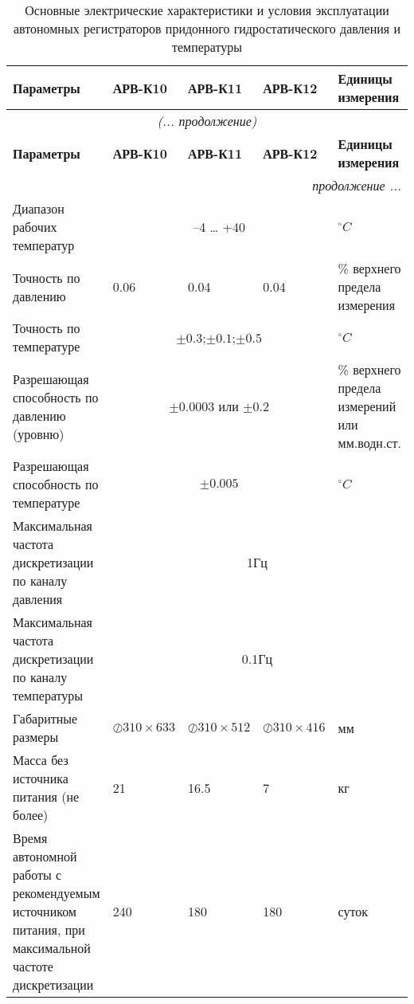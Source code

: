 \begin{longtable}{|X |X |X |X| X|}
\caption{Основные электрические характеристики и условия эксплуатации автономных регистраторов придонного гидростатического давления и температуры}\label{tbl:charact}\\
    \hline
        \textbf{Параметры} & \textbf{АРВ-К10} & \textbf{АРВ-К11} & \textbf{АРВ-К12} & \textbf{Единицы измерения} \\
    \hline
        \endfirsthead
    \hline
        \multicolumn{5}{c}{\small\slshape (... продолжение)} \\
    \hline
        \textbf{Параметры} & \textbf{АРВ-К10}&\textbf{АРВ-К11}& \textbf{АРВ-К12} & \textbf{Единицы измерения} \\
    \hline
        \endhead
    \hline
        \multicolumn{5}{|r|}{\small\slshape продолжение ...}  \\
    \hline
        \endfoot
    \hline
        \endlastfoot
    \hline
        Диапазон рабочих температур  & \multicolumn{3}{|c|}{–4 … +40}& $^{\circ}C$ \\
  \hline
        Точность по давлению & 0.06 & 0.04 & 0.04 &  \% верхнего предела измерения \\
  \hline
        Точность по температуре & \multicolumn{3}{|c|}{$\pm0.3$;$\pm0.1$;$\pm0.5$} & $^{\circ}C$ \\
  \hline
        Разрешающая способность по давлению (уровню) & \multicolumn{3}{|c|}{$\pm0.0003$ или $\pm0.2$}& \% верхнего предела измерений или мм.водн.ст. \\
  \hline
        Разрешающая способность по температуре & \multicolumn{3}{|c|}{$\pm0.005$}& $^{\circ}C$  \\
  \hline
        Максимальная частота дискретизации по каналу давления & \multicolumn{4}{|c|}{1Гц} \\
  \hline
        Максимальная частота дискретизации по каналу температуры & \multicolumn{4}{|c|}{0.1Гц} \\
  \hline
        Габаритные размеры & $\oslash310\times633$ & $\oslash310\times512$ & $\oslash310\times416$ & мм  \\
  \hline
        Масса без источника питания (не более) & 21 & 16.5 & 7 & кг  \\
  \hline
        Время автономной работы с рекомендуемым источником питания, при максимальной частоте дискретизации & 240 & 180 & 180 & суток  \\
  \hline
  \hline
\end{longtable}

